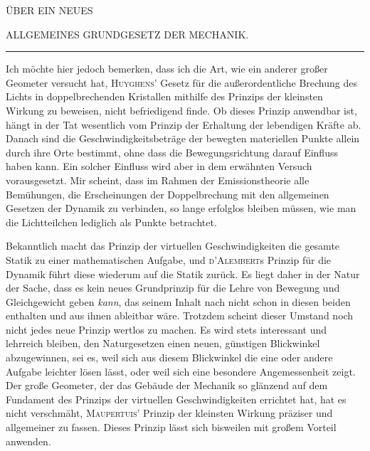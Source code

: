\begin{center}
ÜBER EIN NEUES\par
\bigskip
ALLGEMEINES GRUNDGESETZ DER MECHANIK.\par
\medskip
\rule{.16\textwidth}{.3pt}
\end{center}
\expandafter\def\csname HistoricalNoteText2\endcsname{Ich möchte hier jedoch bemerken, dass ich die Art, wie ein anderer großer Geometer versucht hat, \textsc{Huyghens}’ Gesetz für die außerordentliche Brechung des Lichts in doppelbrechenden Kristallen mithilfe des Prinzips der kleinsten Wirkung zu beweisen, nicht befriedigend finde. Ob dieses Prinzip anwendbar ist, hängt in der Tat wesentlich vom Prinzip der Erhaltung der lebendigen Kräfte ab. Danach sind die Geschwindigkeitsbeträge der bewegten materiellen Punkte allein durch ihre Orte bestimmt, ohne dass die Bewegungsrichtung darauf Einfluss haben kann. Ein solcher Einfluss wird aber in dem erwähnten Versuch vorausgesetzt. Mir scheint, dass im Rahmen der Emissionstheorie alle Bemühungen, die Erscheinungen der Doppelbrechung mit den allgemeinen Gesetzen der Dynamik zu verbinden, so lange erfolglos bleiben müssen, wie man die Lichtteilchen lediglich als Punkte betrachtet.}
\par
Bekanntlich macht das Prinzip der virtuellen Geschwindigkeiten die gesamte Statik zu einer mathematischen Aufgabe, und \textsc{d’Alembert}s Prinzip für die Dynamik führt diese wiederum auf die Statik zurück. Es liegt daher in der Natur der Sache, dass es kein neues Grundprinzip für die Lehre von Bewegung und Gleichgewicht geben \textit{kann}, das seinem Inhalt nach nicht schon in diesen beiden enthalten und aus ihnen ableitbar wäre. Trotzdem scheint dieser Umstand noch nicht jedes neue Prinzip wertlos zu machen. Es wird stets interessant und lehrreich bleiben, den Naturgesetzen einen neuen, günstigen Blickwinkel abzugewinnen, sei es, weil sich aus diesem Blickwinkel die eine oder andere Aufgabe leichter lösen lässt, oder weil sich eine besondere Angemessenheit zeigt. Der große Geometer, der das Gebäude der Mechanik so glänzend auf dem Fundament des Prinzips der virtuellen Geschwindigkeiten errichtet hat, hat es nicht verschmäht, \textsc{Maupertuis}’ Prinzip der kleinsten Wirkung präziser und allgemeiner zu fassen. Dieses Prinzip lässt sich bisweilen mit großem Vorteil anwenden.
